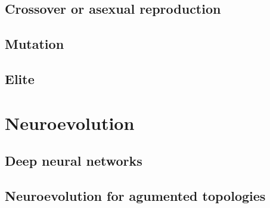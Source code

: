 \subsection{Crossover or asexual reproduction}

\subsection{Mutation}

\subsection{Elite}

\section{Neuroevolution}

\subsection{Deep neural networks}

\subsection{Neuroevolution for agumented topologies}
